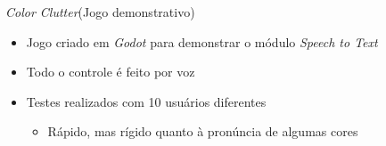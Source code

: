 \begin{frame}{\textit{Color Clutter}}{(Jogo demonstrativo)}

\begin{itemize}
\item Jogo criado em \textit{Godot} para demonstrar o módulo \textit{Speech to Text}
\item Todo o controle é feito por voz
\end{itemize}


\begin{itemize}
\item<3-> Testes realizados com 10 usuários diferentes
\begin{itemize}
    \item<4-> Rápido, mas rígido quanto à pronúncia de algumas cores
\end{itemize}
\end{itemize}

\end{frame}
